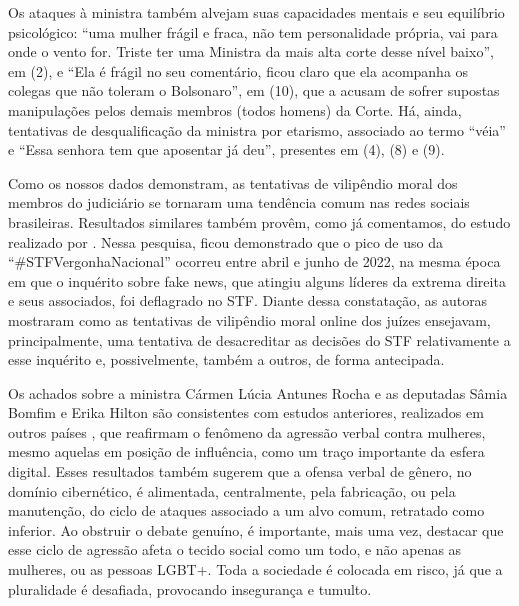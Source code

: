 \documentclass[portuguese]{textolivre}
\begin{document}
Os ataques à ministra também alvejam suas capacidades mentais e seu equilíbrio psicológico: ``uma mulher frágil e fraca, não tem personalidade própria, vai para onde o vento for. Triste ter uma Ministra da mais alta corte desse nível baixo'', em (2), e ``Ela é frágil no seu comentário, ficou claro que ela acompanha os colegas que não toleram o Bolsonaro'', em (10), que a acusam de sofrer supostas manipulações pelos demais membros (todos homens) da Corte. Há, ainda, tentativas de desqualificação da ministra por etarismo, associado ao termo ``véia'' e ``Essa senhora tem que aposentar já deu'', presentes em (4), (8) e (9).

Como os nossos dados demonstram, as tentativas de vilipêndio moral dos membros do judiciário se tornaram uma tendência comum nas redes sociais brasileiras. Resultados similares também provêm, como já comentamos, do estudo realizado por \cite{oliveira2024}. Nessa pesquisa, ficou demonstrado que o pico de uso da ``\#STFVergonhaNacional'' ocorreu entre abril e junho de 2022, na mesma época em que o inquérito sobre fake news, que atingiu alguns líderes da extrema direita e seus associados, foi deflagrado no STF. Diante dessa constatação, as autoras mostraram como as tentativas de vilipêndio moral online dos juízes ensejavam, principalmente, uma tentativa de desacreditar as decisões do STF relativamente a esse inquérito e, possivelmente, também a outros, de forma antecipada.

Os achados sobre a ministra Cármen Lúcia Antunes Rocha e as deputadas Sâmia Bomfim e Erika Hilton são consistentes com estudos anteriores, realizados em outros países \cite{wodak2021, wodak2021culpeper}, que reafirmam o fenômeno da agressão verbal contra mulheres, mesmo aquelas em posição de influência, como um traço importante da esfera digital. Esses resultados também sugerem que a ofensa verbal de gênero, no domínio cibernético, é alimentada, centralmente, pela fabricação, ou pela manutenção, do ciclo de ataques associado a um alvo comum, retratado como inferior. Ao obstruir o debate genuíno, é importante, mais uma vez, destacar que esse ciclo de agressão afeta o tecido social como um todo, e não apenas as mulheres, ou as pessoas LGBT+. Toda a sociedade é colocada em risco, já que a pluralidade é desafiada, provocando insegurança e tumulto.
\end{document}
